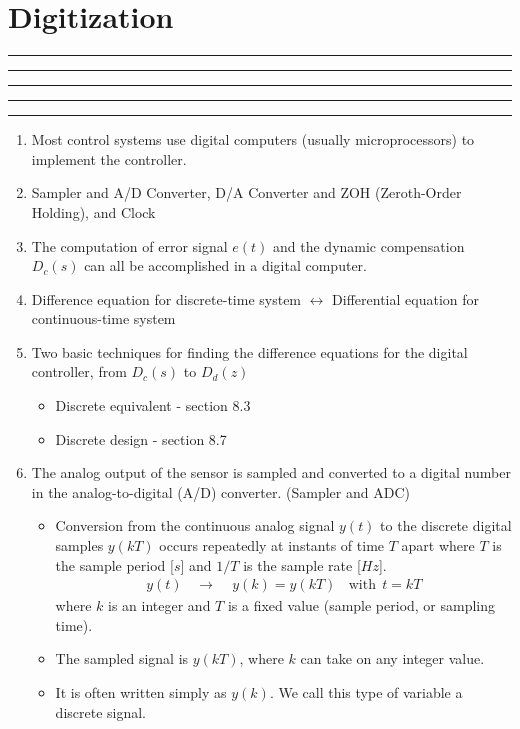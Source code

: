 \setcounter{chapter}{7}
\setcounter{section}{0}
\section{Digitization}
\vspace{-8pt} \hrule \hrule \hrule \hrule \hrule  \vspace{12pt}
\begin{enumerate}
 \item Most control systems use digital computers (usually microprocessors) to implement the controller. 
 \item Sampler and A/D Converter, D/A Converter and ZOH (Zeroth-Order Holding), and Clock
 \item The computation of error signal $e(t)$ and the dynamic compensation $D_c(s)$ can all be accomplished in a digital computer. 
 \item Difference equation for discrete-time system $\leftrightarrow$ Differential equation for continuous-time system 
 \item Two basic techniques for finding the difference equations for the digital controller, from $D_c(s)$ to $D_d(z)$ 
 \begin{itemize}
  \item Discrete equivalent - section 8.3 
  \item Discrete design  - section 8.7 
 \end{itemize} 
 \item The analog output of the sensor is sampled and converted to a digital number in the analog-to-digital (A/D) converter. (Sampler and ADC)
 \begin{itemize}
  \item Conversion from the continuous analog signal $y(t)$ to the discrete digital samples $y(kT)$ occurs repeatedly at instants of time $T$ apart where $T$ is the sample period [$s$] and $1/T$ is the sample rate [$Hz$].
  \begin{align*}
   y(t) ~~~~ \rightarrow~~~~~y (k) = y(kT) ~~~~\mbox{with} ~~ t = kT  
  \end{align*}
  where $k$ is an integer and $T$ is a fixed value (sample period, or sampling time). 
  \item The sampled signal is $y(kT)$, where $k$ can take on any integer value. 
  \item It is often written simply as $y(k)$. We call this type of variable a discrete signal. 
 \end{itemize}  

\end{enumerate}

